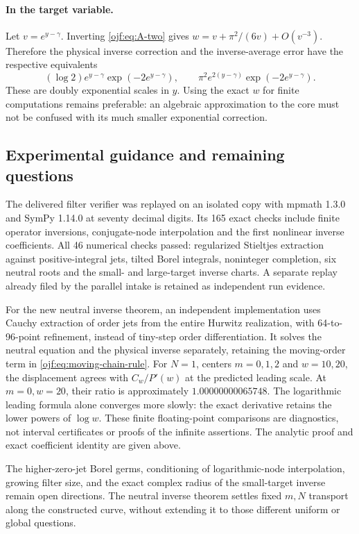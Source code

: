 \paragraph{In the target variable.}
Let $v=e^{y-\gamma}$. Inverting \eqref{ojf:eq:A-two} gives
$w=v+\pi^2/(6v)+O(v^{-3})$. Therefore the physical inverse correction
and the inverse-average error have the respective equivalents
\begin{equation}\label{ojf:eq:double-exponential}
 (\log2)e^{y-\gamma}\exp(-2e^{y-\gamma}),\qquad
 \pi^2e^{2(y-\gamma)}\exp(-2e^{y-\gamma}).
\end{equation}
These are doubly exponential scales in $y$. Using the exact $w$ for
finite computations remains preferable: an algebraic approximation to
the core must not be confused with its much smaller exponential
correction.


\subsection{Experimental guidance and remaining questions}

The delivered filter verifier was replayed on an isolated copy with
mpmath 1.3.0 and SymPy 1.14.0 at seventy decimal digits. Its 165 exact
checks include finite operator inversions, conjugate-node interpolation
and the first nonlinear inverse coefficients. All 46 numerical checks
passed: regularized Stieltjes extraction against positive-integral jets,
tilted Borel integrals, noninteger completion, six neutral roots and the
small- and large-target inverse charts. A separate replay already filed
by the parallel intake is retained as independent run evidence.

For the new neutral inverse theorem, an independent implementation uses
Cauchy extraction of order jets from the entire Hurwitz realization,
with 64-to-96-point refinement, instead of tiny-step order
differentiation. It solves the neutral equation and the physical inverse
separately, retaining the moving-order term in
\eqref{ojf:eq:moving-chain-rule}. For $N=1$, centers $m=0,1,2$ and
$w=10,20$, the displacement agrees with $C_w/P'(w)$ at the predicted
leading scale. At $m=0,w=20$, their ratio is approximately
$1.00000000065748$. The logarithmic leading formula alone converges
more slowly: the exact derivative retains the lower powers of $\log w$.
These finite floating-point comparisons are diagnostics, not interval
certificates or proofs of the infinite assertions. The analytic proof
and exact coefficient identity are given above.

The higher-zero-jet Borel germs, conditioning of logarithmic-node
interpolation, growing filter size, and the exact complex radius of the
small-target inverse remain open directions. The neutral inverse theorem
settles fixed $m,N$ transport along the constructed curve, without
extending it to those different uniform or global questions.
